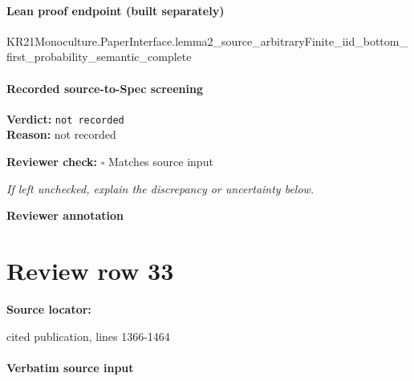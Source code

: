 \documentclass[10pt]{article}
\newcommand{\reviewerbox}{%
  \par\noindent\fbox{\parbox{0.96\linewidth}{\rule{0pt}{0.38in}}}\par
}
\newcommand{\reviewmatch}[1]{%
  \par\noindent\textbf{Reviewer check:} $\square$\; #1\par
  \noindent\emph{If left unchecked, explain the discrepancy or uncertainty below.}\par
}
\begin{document}
\paragraph{Lean proof endpoint (built separately)}\begin{ReviewVerbatim}
KR21Monoculture.PaperInterface.lemma2_source_arbitraryFinite_iid_bottom_first_probability_semantic_complete
\end{ReviewVerbatim}

\paragraph{Recorded source-to-Spec screening}
\textbf{Verdict:} \texttt{not recorded}
\\
\textbf{Reason:} not recorded
\reviewmatch{Matches source input}
\noindent\textbf{Reviewer annotation}\par
\reviewerbox
\clearpage
\hypertarget{source-claim-a48d69bf76046da3}{}
\section*{Review row 33}
\textbf{Source locator:} {\footnotesize\raggedright cited publication, lines 1366-\allowbreak{}1464\par}
\paragraph{Verbatim source input}
\begin{ReviewVerbatim}
\end{ReviewVerbatim}
\end{document}

